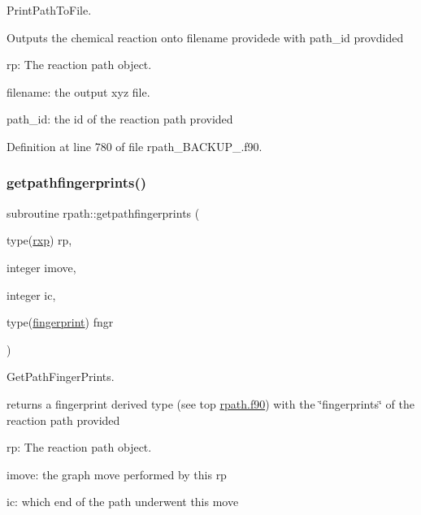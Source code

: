 Print\+Path\+To\+File. 

Outputs the chemical reaction onto filename providede with path\+\_\+id provdided


\begin{DoxyItemize}
\item rp\+: The reaction path object.
\item filename\+: the output xyz file.
\item path\+\_\+id\+: the id of the reaction path provided 
\end{DoxyItemize}

Definition at line 780 of file rpath\+\_\+\+B\+A\+C\+K\+U\+P\+\_.\+f90.

\mbox{\label{namespacerpath_ab5e5d395f73dd82e69efa6977b748dc9}} 
\subsubsection{\texorpdfstring{getpathfingerprints()}{getpathfingerprints()}\hspace{0.1cm}{\footnotesize\ttfamily [2/2]}}
{\footnotesize\ttfamily subroutine rpath\+::getpathfingerprints (\begin{DoxyParamCaption}\item[{type(\mbox{\hyperlink{structrpath_1_1rxp}{rxp}})}]{rp,  }\item[{integer}]{imove,  }\item[{integer}]{ic,  }\item[{type(\mbox{\hyperlink{structrpath_1_1fingerprint}{fingerprint}})}]{fngr }\end{DoxyParamCaption})}



Get\+Path\+Finger\+Prints. 

returns a fingerprint derived type (see top \mbox{\hyperlink{rpath_8f90_source}{rpath.\+f90}}) with the \char`\"{}fingerprints\char`\"{} of the reaction path provided


\begin{DoxyItemize}
\item rp\+: The reaction path object.
\item imove\+: the graph move performed by this rp
\item ic\+: which end of the path underwent this move 
\end{DoxyItemize}

